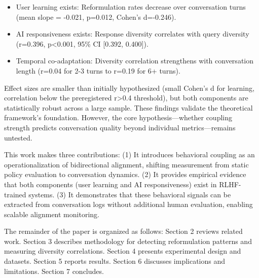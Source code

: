 \begin{itemize}
\item User learning exists: Reformulation rates decrease over conversation turns (mean slope = -0.021, p=0.012, Cohen's d=-0.246).
\item AI responsiveness exists: Response diversity correlates with query diversity (r=0.396, p<0.001, 95\% CI [0.392, 0.400]).
\item Temporal co-adaptation: Diversity correlation strengthens with conversation length (r=0.04 for 2-3 turns to r=0.19 for 6+ turns).
\end{itemize}

Effect sizes are smaller than initially hypothesized (small Cohen's d for learning, correlation below the preregistered r>0.4 threshold), but both components are statistically robust across a large sample. These findings validate the theoretical framework's foundation. However, the core hypothesis---whether coupling strength predicts conversation quality beyond individual metrics---remains untested.

This work makes three contributions: (1) It introduces behavioral coupling as an operationalization of bidirectional alignment, shifting measurement from static policy evaluation to conversation dynamics. (2) It provides empirical evidence that both components (user learning and AI responsiveness) exist in RLHF-trained systems. (3) It demonstrates that these behavioral signals can be extracted from conversation logs without additional human evaluation, enabling scalable alignment monitoring.

The remainder of the paper is organized as follows: Section 2 reviews related work. Section 3 describes methodology for detecting reformulation patterns and measuring diversity correlations. Section 4 presents experimental design and datasets. Section 5 reports results. Section 6 discusses implications and limitations. Section 7 concludes.
